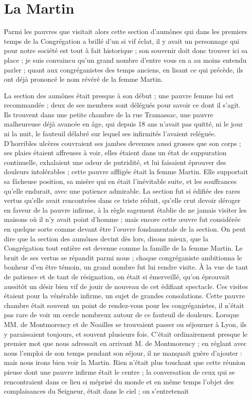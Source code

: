\section*{La Martin}
Parmi les pauvres que visitait alors cette section d'aumônes qui dans les premiers temps de la Congrégation a brillé d'un si vif éclat, il y avait un personnage qui pour notre société est tout à fait historique ; son souvenir doit donc trouver ici sa place ; je suis convaincu qu'un grand nombre d'entre vous en a au moins entendu parler ; quant aux congréganistes des temps anciens, en lisant ce qui précède, ils ont déjà prononcé le nom révéré de la femme Martin.

La section des aumônes était presque à son début ; une pauvre femme lui est recommandée ; deux de ses membres sont délégués pour savoir ce dont il s'agit. Ils trouvent dans une petite chambre de la rue Tramassac, une pauvre malheureuse déjà avancée en âge, qui depuis 18 ans n'avait pas quitté, ni le jour ni la nuit, le fauteuil délabré sur lequel ses infirmités l'avaient reléguée. D'horribles ulcères couvraient ses jambes devenues aussi grosses que son corps ; ses plaies étaient affreuses à voir, elles étaient dans un état de suppuration continuelle, exhalaient une odeur de putridité, et lui faisaient éprouver des douleurs intolérables ; cette pauvre affligée était la femme Martin. Elle
supportait sa fâcheuse position, sa misère qui en était l'inévitable suite, et les souffrances qu'elle endurait, avec une patience admirable. La section fut si édifiée des rares vertus qu'elle avait rencontrées dans ce triste réduit, qu'elle crut devoir déroger en faveur de la pauvre infirme, à la règle sagement établie de ne jamais visiter les maisons où il n'y avait point d'homme ; mais encore cette œuvre fut considérée en quelque sorte comme devant être l'œuvre fondamentale de la section. On peut dire que la section des aumônes devint dès lors, disons mieux, que la Congrégation tout entière est devenue comme la famille de la femme Martin. Le bruit de ses vertus se répandit parmi nous ; chaque congréganiste ambitionna le bonheur d'en être témoin, un grand nombre fut lui rendre visite. À la vue de tant de patience et de tant de résignation, on était si émerveillé, qu'on éprouvait aussitôt un désir bien vif de jouir de nouveau de cet édifiant spectacle. Ces visites étaient pour la vénérable infirme, un sujet de grandes consolations. Cette pauvre chambre était souvent un point de rendez-vous pour les congréganistes, il n'était pas rare de voir un cercle nombreux autour de ce fauteuil de douleurs. Lorsque MM. de Montmorency et de Noailles se trouvaient passer ou séjourner à Lyon, ils y paraissaient toujours, et souvent plusieurs fois. C'était ordinairement presque le premier mot que nous adressait en arrivant M. de Montmorency ; en réglant avec nous l'emploi de son temps pendant son séjour, il ne manquait guère d'ajouter : mais nous irons bien voir la Martin. Rien n'était plus touchant que cette réunion pieuse dont une pauvre infirme était le centre ; la conversation de ceux qui se rencontraient dans ce lieu si méprisé du monde et en même temps l'objet des complaisances du Seigneur, était dans le ciel ; on s'entretenait

